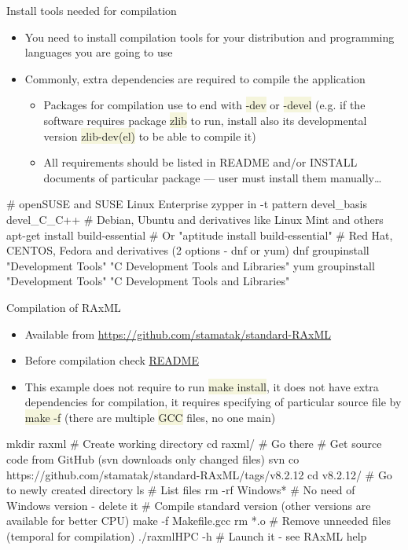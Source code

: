 \documentclass[compress, ucs, xelatex, 11pt, xcolor=svgnames, aspectratio=169,
	hyperref={
		bookmarks=true,
		unicode=true,
		colorlinks=true,
		pdftitle={Linux, command line and MetaCentrum},
		plainpages=false,
		pdfauthor={Vojtech Zeisek},
		pdfsubject={Course about use of Linux command line, writing shell scripts and using MetaCentrum of CESNET},
		pdfcreator={XeLaTeX},
		pdfkeywords={Linux, GNU, BASH, shell, command line, MetaCentrum},
		linkcolor=DarkRed, %
		anchorcolor=DarkBlue, %
		citecolor=Indigo, %
		filecolor=NavyBlue, %
		menucolor=DarkMagenta, %
		urlcolor=DarkBlue, %
		pdftex},
	url={hyphens, lowtilde} %
	]{beamer}
\renewcommand{\texttt}[1]{\colorbox{Beige}{{\ttfamily #1}}}
\begin{document}
\begin{frame}[fragile]{Install tools needed for compilation}
	\begin{itemize}
		\item You need to install compilation tools for your distribution and programming languages you are going to use
		\item Commonly, extra dependencies are required to compile the application
		\begin{itemize}
			\item Packages for compilation use to end with \texttt{-dev} or \texttt{-devel} (e.g. if the software requires package \texttt{zlib} to run, install also its developmental version \texttt{zlib-dev(el)} to be able to compile it)
			\item All requirements should be listed in README and/or INSTALL documents of particular package --- user must install them manually\ldots
		\end{itemize}
	\end{itemize}
	\vfill
	\begin{bashcode}
    # openSUSE and SUSE Linux Enterprise
    zypper in -t pattern devel_basis devel_C_C++
    # Debian, Ubuntu and derivatives like Linux Mint and others
    apt-get install build-essential # Or "aptitude install build-essential"
    # Red Hat, CENTOS, Fedora and derivatives (2 options - dnf or yum)
    dnf groupinstall "Development Tools" "C Development Tools and Libraries"
    yum groupinstall "Development Tools" "C Development Tools and Libraries"
	\end{bashcode}
\end{frame}

\begin{frame}[fragile]{Compilation of RAxML}
	\begin{itemize}
		\item Available from \url{https://github.com/stamatak/standard-RAxML}
		\item Before compilation check \href{https://github.com/stamatak/standard-RAxML/blob/master/README}{README}
		\item This example does not require to run \texttt{make install}, it does not have extra dependencies for compilation, it requires specifying of particular source file by \texttt{make -f} (there are multiple \texttt{GCC} files, no one main)
	\end{itemize}
	\begin{bashcode}
    mkdir raxml # Create working directory
    cd raxml/ # Go there
    # Get source code from GitHub (svn downloads only changed files)
    svn co https://github.com/stamatak/standard-RAxML/tags/v8.2.12
    cd v8.2.12/ # Go to newly created directory
    ls # List files
    rm -rf Windows* # No need of Windows version - delete it
    # Compile standard version (other versions are available for better CPU)
    make -f Makefile.gcc
    rm *.o # Remove unneeded files (temporal for compilation)
    ./raxmlHPC -h # Launch it - see RAxML help
	\end{bashcode}
\end{frame}
\end{document}
